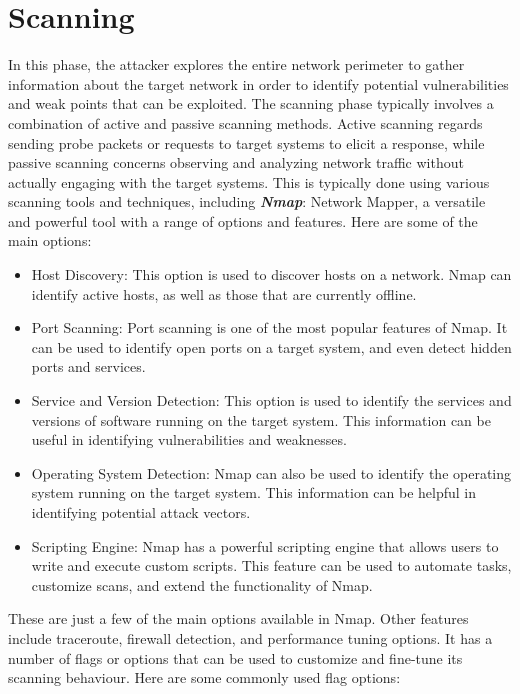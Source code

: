 \documentclass[a4paper, 12pt, oneside]{extbook}
\begin{document}
\chapter{Scanning}
In this phase, the attacker explores the entire network perimeter to gather information about 
the target network in order to identify potential vulnerabilities and weak points that can be exploited.  
\newline The scanning phase typically involves a combination of active and passive scanning methods. Active scanning regards 
sending probe packets or requests to target systems to elicit a response, while passive scanning concerns observing and analyzing network traffic without actually engaging with the target systems. 
This is typically done using various scanning tools and techniques, including \textbf{\textit{Nmap}}: Network Mapper, a versatile and powerful tool with a range of options and features. 
Here are some of the main options:
\begin{itemize}
  \item Host Discovery: This option is used to discover hosts on a network. Nmap can identify active hosts, as well as those that are currently offline.
  \item Port Scanning: Port scanning is one of the most popular features of Nmap. It can be used to identify open ports on a target system, and even detect hidden ports and services.
  \item Service and Version Detection: This option is used to identify the services and versions of software running on the target system. This information can be useful in identifying vulnerabilities and weaknesses.
  \item Operating System Detection: Nmap can also be used to identify the operating system running on the target system. This information can be helpful in identifying potential attack vectors.
  \item Scripting Engine: Nmap has a powerful scripting engine that allows users to write and execute custom scripts. This feature can be used to automate tasks, customize scans, and extend the functionality of Nmap.
\end{itemize} 
These are just a few of the main options available in Nmap. Other features include traceroute, firewall detection, and performance tuning options.
It has a number of flags or options that can be used to customize and fine-tune its scanning behaviour.
\newline Here are some commonly used flag options:
\end{document}
